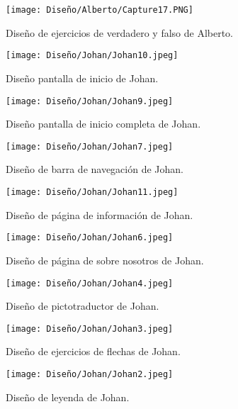 \begin{figure}[ht!]
  \centering
\texttt{[image: Diseño/Alberto/Capture17.PNG]}
  \caption{Diseño de ejercicios de verdadero y falso de Alberto.}
\end{figure}





\begin{figure}[ht!]
  \centering
  \texttt{[image: Diseño/Johan/Johan10.jpeg]}
  \caption{Diseño pantalla de inicio de Johan.}
  \label{Johan10}
\end{figure}

\begin{figure}[ht!]
  \centering
  \texttt{[image: Diseño/Johan/Johan9.jpeg]}
  \caption{Diseño pantalla de inicio completa de Johan.}
  \label{Johan9}
\end{figure}

\begin{figure}[ht!]
  \centering
  \texttt{[image: Diseño/Johan/Johan7.jpeg]}
  \caption{Diseño de barra de navegación de Johan.}
  \label{Johan7}
\end{figure}

\begin{figure}[ht!]
  \centering
  \texttt{[image: Diseño/Johan/Johan11.jpeg]}
  \caption{Diseño de página de información de Johan.}
  \label{Johan11}
\end{figure}

\begin{figure}[ht!]
  \centering
  \texttt{[image: Diseño/Johan/Johan6.jpeg]}
  \caption{Diseño de página de sobre nosotros de Johan.}
  \label{Johan6}
\end{figure}

\begin{figure}[ht!]
  \centering
  \texttt{[image: Diseño/Johan/Johan4.jpeg]}
  \caption{Diseño de pictotraductor de Johan.}
  \label{Johan4}
\end{figure}

\begin{figure}[ht!]
  \centering
  \texttt{[image: Diseño/Johan/Johan3.jpeg]}
  \caption{Diseño de ejercicios de flechas de Johan.}
  \label{Johan3}
\end{figure}

\begin{figure}[ht!]
  \centering

\texttt{[image: Diseño/Johan/Johan2.jpeg]}
  \caption{Diseño de leyenda de Johan.}
  \label{Johan2}
\end{figure}

